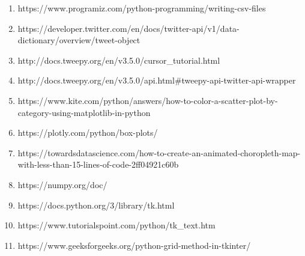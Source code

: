 \documentclass[a4paper, 11pt]{report}
\begin{document}
\begin{itemize}
\begin{enumerate}
    \item https://www.programiz.com/python-programming/writing-csv-files

    \item https://developer.twitter.com/en/docs/twitter-api/v1/data-dictionary/overview/tweet-object

    \item http://docs.tweepy.org/en/v3.5.0/cursor\_tutorial.html

    \item http://docs.tweepy.org/en/v3.5.0/api.html#tweepy-api-twitter-api-wrapper

    \item https://www.kite.com/python/answers/how-to-color-a-scatter-plot-by-category-using-matplotlib-in-python

    \item https://plotly.com/python/box-plots/

    \item https://towardsdatascience.com/how-to-create-an-animated-choropleth-map-with-less-than-15-lines-of-code-2ff04921c60b

    \item https://numpy.org/doc/

    \item https://docs.python.org/3/library/tk.html

    \item https://www.tutorialspoint.com/python/tk\_text.htm

    \item https://www.geeksforgeeks.org/python-grid-method-in-tkinter/
\end{enumerate}


\end{itemize}
\end{document}
